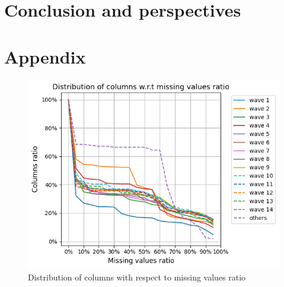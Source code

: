 \documentclass[]{article}
\begin{document}
\section{Conclusion and perspectives}

\cleardoublepage
\appendix
\section{Appendix}
\begin{figure}[!h]
	\centering
	\includegraphics[scale = 0.75]{distribution_of_columns_wrt_missing_values_ratio.png}
	\caption{Distribution of columns with respect to missing values ratio}
	\label{distribution_of_columns_wrt_missing_values_ratio}
\end{figure}
\end{document}
